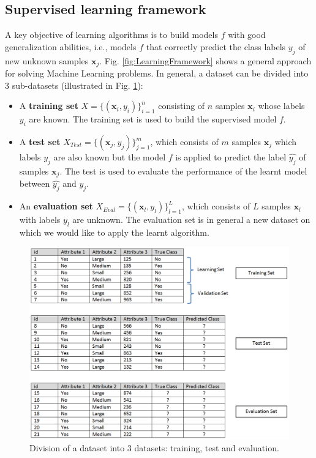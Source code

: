 \subsection{Supervised learning framework}
A key objective of learning algorithms is to build models $f$ with good generalization abilities, i.e., models $f$ that correctly predict the class labels $y_j$ of new unknown samples $\textbf{x}_j$. Fig. \ref{fig:LearningFramework} shows a general approach for solving Machine Learning problems. In general, a dataset can be divided into 3 sub-datasets (illustrated in Fig. \ref{fig:Dataset}):
\begin{itemize}
	\item A \textbf{training set} $X=\{(\textbf{x}_i,y_i)\}_{i=1}^n$ consisting of $n$ samples $\textbf{x}_i$ whose labels $y_i$ are known. The training set is used to build the supervised model $f$. 
	\item A \textbf{test set} $X_{Test}=\{(\textbf{x}_j,y_j)\}_{j=1}^m$, which consists of $m$ samples $\textbf{x}_j$ which labels $y_j$ are also known but the model $f$ is applied to predict the label $\hat{y_j}$ of samples $\textbf{x}_j$. The test is used to evaluate the performance of the learnt model between $\hat{y_j}$ and $y_j$. 
	\item An \textbf{evaluation set} $X_{Eval}=\{(\textbf{x}_l,y_l)\}_{l=1}^L$, which consists of $L$ samples $\textbf{x}_l$ with labels $y_l$ are unknown. The evaluation set is in general a new dataset on which we would like to apply the learnt algorithm. 
\end{itemize}

\begin{figure}[h!]
\centering
\includegraphics[width=0.9\linewidth]{images/Dataset}
\caption{Division of a dataset into 3 datasets: training, test and evaluation.}
\label{fig:Dataset}
\end{figure}

